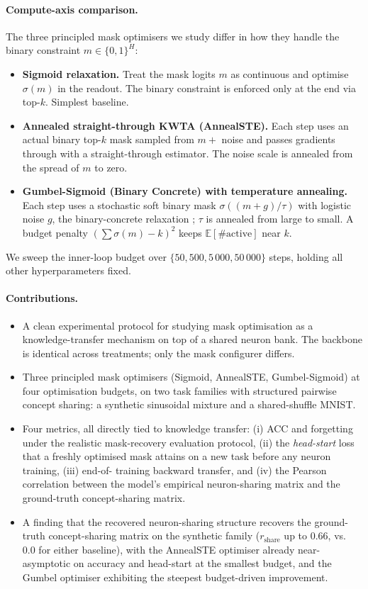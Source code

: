 \documentclass{article}
\theoremstyle{plain}
\theoremstyle{remark}
\begin{document}
\paragraph{Compute-axis comparison.}
The three principled mask optimisers we study differ in how they
handle the binary constraint $m\in\{0,1\}^H$:
\begin{itemize}
\item \textbf{Sigmoid relaxation.} Treat the mask logits $m$ as
continuous and optimise $\sigma(m)$ in the readout. The binary
constraint is enforced only at the end via top-$k$. Simplest baseline.
\item \textbf{Annealed straight-through KWTA (AnnealSTE).} Each step
uses an actual binary top-$k$ mask sampled from $m+$ noise and passes
gradients through with a straight-through estimator. The noise scale
is annealed from the spread of $m$ to zero.
\item \textbf{Gumbel-Sigmoid (Binary Concrete) with temperature
annealing.} Each step uses a stochastic soft binary mask $\sigma((m +
g)/\tau)$ with logistic noise $g$, the binary-concrete relaxation
\citep{maddison2017concrete, jang2017categorical}; $\tau$ is annealed
from large to small. A budget penalty $(\sum \sigma(m)-k)^2$ keeps
$\mathbb{E}[\#\mathrm{active}]$ near $k$.
\end{itemize}
We sweep the inner-loop budget over $\{50, 500, 5\,000, 50\,000\}$
steps, holding all other hyperparameters fixed.

\paragraph{Contributions.}
\begin{itemize}
\item A clean experimental protocol for studying mask optimisation as
a knowledge-transfer mechanism on top of a shared neuron bank. The
backbone is identical across treatments; only the mask configurer
differs.
\item Three principled mask optimisers (Sigmoid, AnnealSTE,
Gumbel-Sigmoid) at four optimisation budgets, on two task families
with structured pairwise concept sharing: a synthetic sinusoidal
mixture and a shared-shuffle MNIST.
\item Four metrics, all directly tied to knowledge transfer: (i) ACC
and forgetting under the realistic mask-recovery evaluation
protocol, (ii) the \emph{head-start} loss that a freshly optimised
mask attains on a new task before any neuron training, (iii) end-of-
training backward transfer, and (iv) the Pearson correlation between
the model's empirical neuron-sharing matrix and the ground-truth
concept-sharing matrix.
\item A finding that the recovered neuron-sharing structure recovers
the ground-truth concept-sharing matrix on the synthetic family
($r_{\mathrm{share}}$ up to $0.66$, vs.\ $0.0$ for either baseline),
with the AnnealSTE optimiser already near-asymptotic on accuracy
and head-start at the smallest budget, and the Gumbel optimiser
exhibiting the steepest budget-driven improvement.
\end{itemize}
\end{document}
